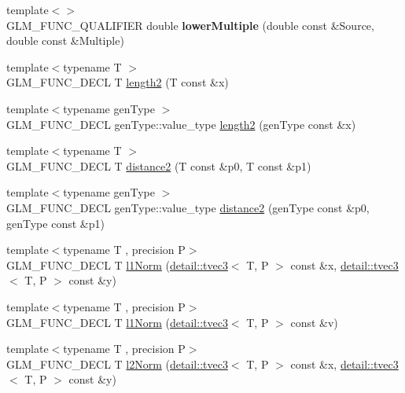 \begin{DoxyCompactItemize}
\item 
{\footnotesize template$<$$>$ }\\G\+L\+M\+\_\+\+F\+U\+N\+C\+\_\+\+Q\+U\+A\+L\+I\+F\+I\+ER double {\bfseries lower\+Multiple} (double const \&Source, double const \&Multiple)\hypertarget{namespaceglm_ab75ca978940a0ba67a95e13b16cde89e}{}\label{namespaceglm_ab75ca978940a0ba67a95e13b16cde89e}

\item 
{\footnotesize template$<$typename T $>$ }\\G\+L\+M\+\_\+\+F\+U\+N\+C\+\_\+\+D\+E\+CL T \hyperlink{group__gtx__norm_ga08c670024cd230e22f8b853f185ff533}{length2} (T const \&x)
\item 
{\footnotesize template$<$typename gen\+Type $>$ }\\G\+L\+M\+\_\+\+F\+U\+N\+C\+\_\+\+D\+E\+CL gen\+Type\+::value\+\_\+type \hyperlink{group__gtx__norm_gaa279ba7fdecbed3f9f2b60502b7ec8ca}{length2} (gen\+Type const \&x)
\item 
{\footnotesize template$<$typename T $>$ }\\G\+L\+M\+\_\+\+F\+U\+N\+C\+\_\+\+D\+E\+CL T \hyperlink{group__gtx__norm_ga3544f6288d3bce2cf2a9f6ebe39e0557}{distance2} (T const \&p0, T const \&p1)
\item 
{\footnotesize template$<$typename gen\+Type $>$ }\\G\+L\+M\+\_\+\+F\+U\+N\+C\+\_\+\+D\+E\+CL gen\+Type\+::value\+\_\+type \hyperlink{group__gtx__norm_gaec2d9df62436879b48207d39516f3788}{distance2} (gen\+Type const \&p0, gen\+Type const \&p1)
\item 
{\footnotesize template$<$typename T , precision P$>$ }\\G\+L\+M\+\_\+\+F\+U\+N\+C\+\_\+\+D\+E\+CL T \hyperlink{group__gtx__norm_gae7c48d18df3e4a9c13bb9c003e434d5f}{l1\+Norm} (\hyperlink{structglm_1_1detail_1_1tvec3}{detail\+::tvec3}$<$ T, P $>$ const \&x, \hyperlink{structglm_1_1detail_1_1tvec3}{detail\+::tvec3}$<$ T, P $>$ const \&y)
\item 
{\footnotesize template$<$typename T , precision P$>$ }\\G\+L\+M\+\_\+\+F\+U\+N\+C\+\_\+\+D\+E\+CL T \hyperlink{group__gtx__norm_ga466d01e7b4350f44250d80ec48128fbd}{l1\+Norm} (\hyperlink{structglm_1_1detail_1_1tvec3}{detail\+::tvec3}$<$ T, P $>$ const \&v)
\item 
{\footnotesize template$<$typename T , precision P$>$ }\\G\+L\+M\+\_\+\+F\+U\+N\+C\+\_\+\+D\+E\+CL T \hyperlink{group__gtx__norm_ga46af6669c4e8b042e284dd3b6c0caf28}{l2\+Norm} (\hyperlink{structglm_1_1detail_1_1tvec3}{detail\+::tvec3}$<$ T, P $>$ const \&x, \hyperlink{structglm_1_1detail_1_1tvec3}{detail\+::tvec3}$<$ T, P $>$ const \&y)

\end{DoxyCompactItemize}
